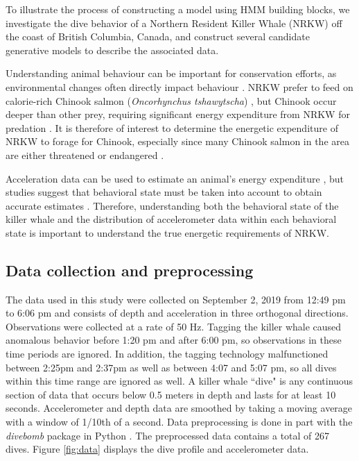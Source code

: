 

To illustrate the process of constructing a model using HMM building blocks, we investigate the dive behavior of a Northern Resident Killer Whale (NRKW) off the coast of British Columbia, Canada, and construct several candidate generative models to describe the associated data.

Understanding animal behaviour can be important for conservation efforts, as environmental changes often directly impact behaviour \citep{Sutherland:1998}. NRKW prefer to feed on calorie-rich Chinook salmon (\textit{Oncorhynchus
tshawytscha}) \citep{Ford:2006}, but Chinook occur deeper than other prey, requiring significant energy expenditure from NRKW for predation \citep{Williams:2009,Noren:2011}. It is therefore of interest to determine the energetic expenditure of NRKW to forage for Chinook, especially since many Chinook salmon in the area are either threatened or endangered \citep{Ford:2015}.

Acceleration data can be used to estimate an animal's energy expenditure \citep{Green:2009,Wilson:2019}, but studies suggest that behavioral state must be taken into account to obtain accurate estimates \citep{Dot:2016}. Therefore, understanding both the behavioral state of the killer whale and the distribution of accelerometer data within each behavioral state is important to understand the true energetic requirements of NRKW.

\subsection{Data collection and preprocessing}

The data used in this study were collected on September 2, 2019 from 12:49 pm to 6:06 pm and consists of depth and acceleration in three orthogonal directions. Observations were collected at a rate of 50 Hz. Tagging the killer whale caused anomalous behavior before 1:20 pm and after 6:00 pm, so observations in these time periods are ignored. In addition, the tagging technology malfunctioned between 2:25pm and 2:37pm as well as between 4:07 and 5:07 pm, so all dives within this time range are ignored as well. A killer whale ``dive" is any continuous section of data that occurs below 0.5 meters in depth and lasts for at least 10 seconds. Accelerometer and depth data are smoothed by taking a moving average with a window of 1/10th of a second. Data preprocessing is done in part with the \textit{divebomb} package in Python \citep{Nunes:2018}. The preprocessed data contains a total of 267 dives. Figure \ref{fig:data} displays the dive profile and accelerometer data.

